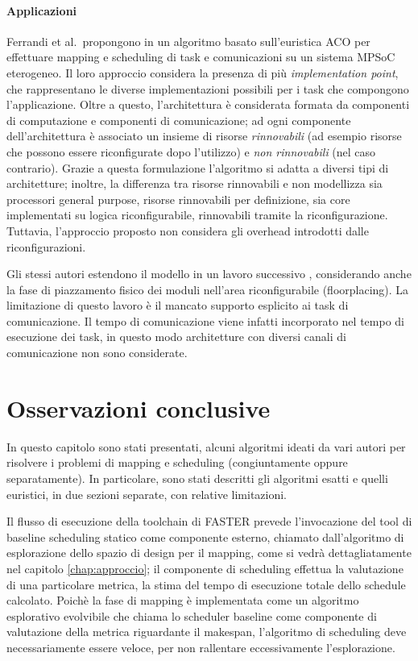 \paragraph{Applicazioni}
Ferrandi et al.~propongono in \cite{AntColonyOptimization} un algoritmo basato 
sull'euristica \ac{ACO} per effettuare mapping e scheduling di task e 
comunicazioni su un sistema \ac{MPSoC} eterogeneo. Il loro approccio considera 
la presenza di più \emph{implementation point}, che rappresentano le diverse 
implementazioni possibili per i task che compongono l'applicazione. Oltre a 
questo, l'architettura è considerata formata da componenti di computazione e 
componenti di comunicazione; ad ogni componente dell'architettura è associato 
un insieme di risorse \emph{rinnovabili} (ad esempio risorse che possono essere 
riconfigurate dopo l'utilizzo) e \emph{non rinnovabili} (nel caso contrario).
Grazie a questa formulazione l'algoritmo si adatta a diversi tipi di 
architetture; inoltre, la differenza tra risorse rinnovabili e non modellizza 
sia processori general purpose, risorse rinnovabili per definizione, sia core 
implementati su logica riconfigurabile, rinnovabili tramite la riconfigurazione.
Tuttavia, l'approccio proposto non considera gli overhead introdotti dalle riconfigurazioni.

Gli stessi autori estendono il modello in un lavoro successivo
\cite{AntColonyOptimizationPlacing}, considerando anche la fase di piazzamento
fisico dei moduli nell'area riconfigurabile (floorplacing).
La limitazione di questo lavoro \`e il mancato supporto esplicito ai task di comunicazione.
Il tempo di comunicazione viene infatti incorporato nel tempo di esecuzione dei task,
in questo modo architetture con diversi canali di comunicazione non sono considerate.

\section{Osservazioni conclusive}
\label{sec:osservazioniConclusiveSoA}
In questo capitolo sono stati presentati, alcuni algoritmi ideati da vari autori per risolvere
i problemi di mapping e scheduling (congiuntamente oppure separatamente).
In particolare, sono stati descritti gli algoritmi
esatti e quelli euristici, in due sezioni separate, con relative limitazioni.

Il flusso di esecuzione della toolchain di \ac{FASTER} prevede l'invocazione del tool di baseline
scheduling statico come componente esterno, chiamato dall'algoritmo di esplorazione dello spazio
di design per il mapping, come si vedr\`a dettagliatamente nel capitolo \ref{chap:approccio};
il componente di scheduling effettua la valutazione di una particolare
metrica, la stima del tempo di esecuzione totale dello schedule calcolato. Poichè la fase
di mapping è implementata come un algoritmo esplorativo evolvibile che chiama lo scheduler
baseline come componente di valutazione della metrica riguardante il makespan, l'algoritmo di
scheduling deve necessariamente essere veloce, per non rallentare eccessivamente l'esplorazione.

